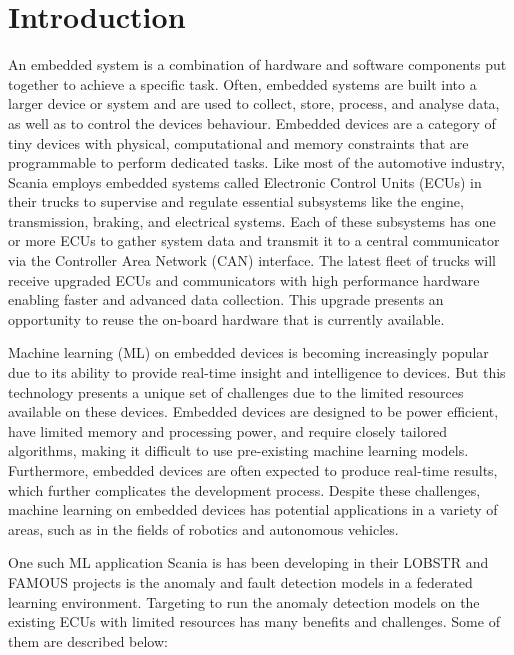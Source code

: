 \part{Introduction}

An embedded system is a combination of hardware and software components put together to achieve a specific task. Often, embedded systems are built into a larger device or system and are used to collect, store, process, and analyse data, as well as to control the device\textquotesingle s behaviour. Embedded devices are a category of tiny devices with physical, computational and memory constraints that are programmable to perform dedicated tasks.
Like most of the automotive industry, Scania employs embedded systems called Electronic Control Units (ECUs) in their trucks to supervise and regulate essential subsystems like the engine, transmission, braking, and electrical systems. Each of these subsystems has one or more ECUs to gather system data and transmit it to a central communicator via the Controller Area Network (CAN) interface. The latest fleet of trucks will receive upgraded ECUs and communicators with high performance hardware enabling faster and advanced data collection. This upgrade presents an opportunity to reuse the on-board hardware that is currently available.

Machine learning (ML) on embedded devices is becoming increasingly popular due to its ability to provide real-time insight and intelligence to devices. But this technology presents a unique set of challenges due to the limited resources available on these devices. Embedded devices are designed to be power efficient, have limited memory and processing power, and require closely tailored algorithms, making it difficult to use pre-existing machine learning models. Furthermore, embedded devices are often expected to produce real-time results, which further complicates the development process. Despite these challenges, machine learning on embedded devices has potential applications in a variety of areas, such as in the fields of robotics and autonomous vehicles. %

One such ML application Scania is has been developing in their \textsc{LOBSTR} \cite{lobstr} and \textsc{FAMOUS} \cite{famous} projects is the anomaly and fault detection models in a federated learning environment. Targeting to run the anomaly detection models on the existing ECUs with limited resources has many benefits and challenges. Some of them are described below:

